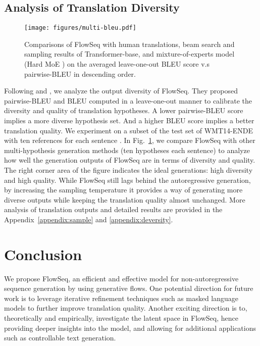 \documentclass[11pt,a4paper]{article}
\begin{document}
\subsection{Analysis of Translation Diversity}
\begin{figure}[tb]
  \centering
  \texttt{[image: figures/multi-bleu.pdf]}
  \caption{Comparisons of FlowSeq with human translations, beam search and sampling results of Transformer-base, and mixture-of-experts model (Hard MoE \cite{shen2019mixture}) on the averaged leave-one-out BLEU score v.s pairwise-BLEU in descending order.} \label{fig:diverse}
  \vspace{-4mm}
\end{figure}
Following \citet{he2018sequence} and \citet{shen2019mixture}, we analyze the output diversity of FlowSeq. They proposed pairwise-BLEU and BLEU computed in a leave-one-out manner to calibrate the diversity and quality of translation hypotheses. A lower pairwise-BLEU score implies a more diverse hypothesis set. And a higher BLEU score implies a better translation quality. We experiment on a subset of the test set of WMT14-ENDE with ten references for each sentence \cite{ott2018analyzing}.
In Fig.~\ref{fig:diverse}, we compare FlowSeq with other multi-hypothesis generation methods (ten hypotheses each sentence) to analyze how well the generation outputs of FlowSeq are in terms of diversity and quality. The right corner area of the figure indicates the ideal generations: high diversity and high quality. While FlowSeq still lags behind the autoregressive generation, by increasing the sampling temperature it provides a way of generating more diverse outputs while keeping the translation quality almost unchanged. More analysis of translation outputs and detailed results are provided in the Appendix~\ref{appendix:sample} and \ref{appendix:deversity}.

\vspace{-1mm}
\section{Conclusion}
We propose FlowSeq, an efficient and effective model for non-autoregressive sequence generation by using generative flows.
One potential direction for future work is to leverage iterative refinement techniques such as masked language models to further improve translation quality. 
Another exciting direction is to, theoretically and empirically, investigate the latent space in FlowSeq, hence providing deeper insights into the model, and allowing for additional applications such as controllable text generation.
\end{document}
